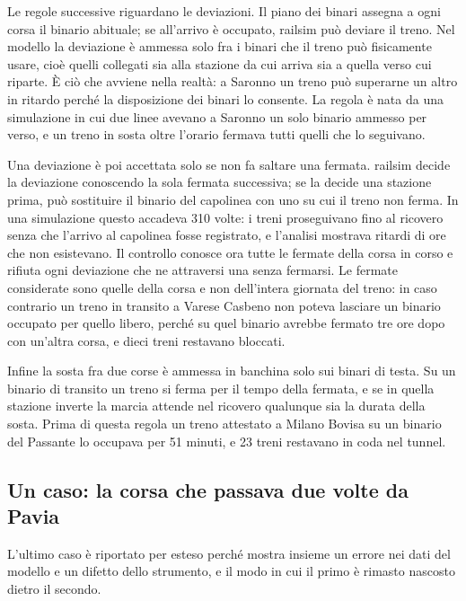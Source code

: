 Le regole successive riguardano le deviazioni. Il piano dei binari assegna a ogni corsa il binario abituale; se all'arrivo è occupato, railsim può deviare il treno. Nel modello la deviazione è ammessa solo fra i binari che il treno può fisicamente usare, cioè quelli collegati sia alla stazione da cui arriva sia a quella verso cui riparte. È ciò che avviene nella realtà: a Saronno un treno può superarne un altro in ritardo perché la disposizione dei binari lo consente. La regola è nata da una simulazione in cui due linee avevano a Saronno un solo binario ammesso per verso, e un treno in sosta oltre l'orario fermava tutti quelli che lo seguivano.

Una deviazione è poi accettata solo se non fa saltare una fermata. railsim decide la deviazione conoscendo la sola fermata successiva; se la decide una stazione prima, può sostituire il binario del capolinea con uno su cui il treno non ferma. In una simulazione questo accadeva 310 volte: i treni proseguivano fino al ricovero senza che l'arrivo al capolinea fosse registrato, e l'analisi mostrava ritardi di ore che non esistevano. Il controllo conosce ora tutte le fermate della corsa in corso e rifiuta ogni deviazione che ne attraversi una senza fermarsi. Le fermate considerate sono quelle della corsa e non dell'intera giornata del treno: in caso contrario un treno in transito a Varese Casbeno non poteva lasciare un binario occupato per quello libero, perché su quel binario avrebbe fermato tre ore dopo con un'altra corsa, e dieci treni restavano bloccati.

Infine la sosta fra due corse è ammessa in banchina solo sui binari di testa. Su un binario di transito un treno si ferma per il tempo della fermata, e se in quella stazione inverte la marcia attende nel ricovero qualunque sia la durata della sosta. Prima di questa regola un treno attestato a Milano Bovisa su un binario del Passante lo occupava per 51 minuti, e 23 treni restavano in coda nel tunnel.

\subsection{Un caso: la corsa che passava due volte da Pavia}
L'ultimo caso è riportato per esteso perché mostra insieme un errore nei dati del modello e un difetto dello strumento, e il modo in cui il primo è rimasto nascosto dietro il secondo.

